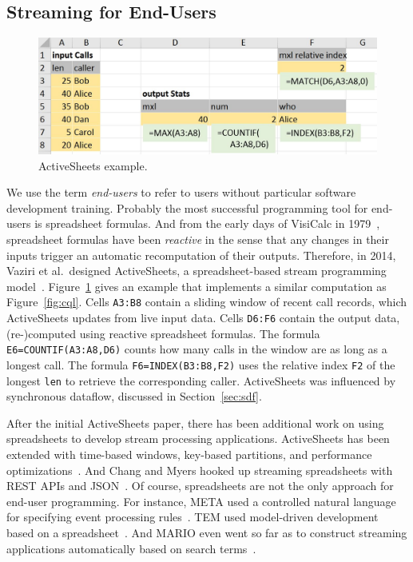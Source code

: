 \subsection{Streaming for End-Users}\label{sec:eup} %

\begin{figure}[!h]
\centerline{\includegraphics[width=\columnwidth]{CallStats.jpg}}
\vspace*{-4mm}
\caption{\label{fig:activesheets}ActiveSheets example.}
\end{figure}

We use the term \emph{end-users} to refer to users without particular
software development training. Probably the most successful
programming tool for end-users is spreadsheet formulas. And from the
early days of VisiCalc in 1979~\cite{bricklin_frankston_1979},
spreadsheet formulas have been \emph{reactive} in the sense that any
changes in their inputs trigger an automatic recomputation of their
outputs. Therefore, in 2014, Vaziri et al.\ designed \textsf{ActiveSheets}, a
spreadsheet-based stream programming model~\cite{vaziri_et_al_2014}.
Figure~\ref{fig:activesheets} gives an example that implements a
similar computation as Figure~\ref{fig:cql}.
Cells \lstinline{A3:B8} contain a sliding window of recent call
records, which ActiveSheets updates from live input data. Cells
\lstinline{D6:F6} contain the output data, \mbox{(re-)}com\-pu\-ted
using reactive spreadsheet formulas. The formula
\mbox{\lstinline{E6=COUNTIF(A3:A8,D6)}} counts how many calls in the
window are as long as a longest call. The formula
\mbox{\lstinline{F6=INDEX(B3:B8,F2)}} uses the relative index \lstinline{F2}
of the longest \lstinline{len} to retrieve the corresponding
caller.  ActiveSheets was influenced by
synchronous dataflow, discussed in Section~\ref{sec:sdf}.

After the initial ActiveSheets paper, there has been additional work
on using spreadsheets to develop stream processing applications.
ActiveSheets has been extended with time-based windows, key-based
partitions, and performance optimizations~\cite{hirzel_et_al_2016}.
And Chang and Myers hooked up streaming spreadsheets with REST APIs and
JSON~\cite{chang_myers_2015}.  Of course, spreadsheets are not the
only approach for end-user programming. For instance, \textsf{META} used a
controlled natural language for specifying event processing
rules~\cite{arnold_et_al_2016}. \textsf{TEM} used model-driven development
based on a spreadsheet~\cite{etzion_et_al_2016}. And \textsf{MARIO} even went
so far as to construct streaming applications automatically based on
search terms~\cite{riabov_et_al_2008}.
